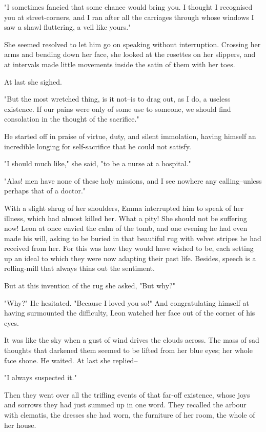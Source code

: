 \documentclass[11pt,twocolumn]{ltugboat}
\begin{document}
"I sometimes fancied that some chance would bring you. I thought I
recognised you at street-corners, and I ran after all the carriages
through whose windows I saw a shawl fluttering, a veil like yours."

She seemed resolved to let him go on speaking without interruption.
Crossing her arms and bending down her face, she looked at the rosettes
on her slippers, and at intervals made little movements inside the satin
of them with her toes.

At last she sighed.

"But the most wretched thing, is it not--is to drag out, as I do, a
useless existence. If our pains were only of some use to someone, we
should find consolation in the thought of the sacrifice."

He started off in praise of virtue, duty, and silent immolation, having
himself an incredible longing for self-sacrifice that he could not
satisfy.

"I should much like," she said, "to be a nurse at a hospital."

"Alas! men have none of these holy missions, and I see nowhere any
calling--unless perhaps that of a doctor."

With a slight shrug of her shoulders, Emma interrupted him to speak of
her illness, which had almost killed her. What a pity! She should not be
suffering now! Leon at once envied the calm of the tomb, and one evening
he had even made his will, asking to be buried in that beautiful rug
with velvet stripes he had received from her. For this was how they
would have wished to be, each setting up an ideal to which they were now
adapting their past life. Besides, speech is a rolling-mill that always
thins out the sentiment.

But at this invention of the rug she asked, "But why?"

"Why?" He hesitated. "Because I loved you so!" And congratulating
himself at having surmounted the difficulty, Leon watched her face out
of the corner of his eyes.

It was like the sky when a gust of wind drives the clouds across. The
mass of sad thoughts that darkened them seemed to be lifted from her
blue eyes; her whole face shone. He waited. At last she replied--

"I always suspected it."

Then they went over all the trifling events of that far-off existence,
whose joys and sorrows they had just summed up in one word. They
recalled the arbour with clematis, the dresses she had worn, the
furniture of her room, the whole of her house.
\end{document}

